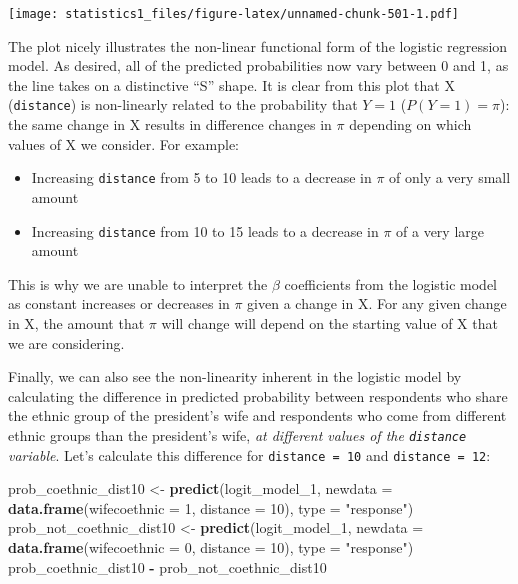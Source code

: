 \documentclass[]{article}
\newenvironment{Shaded}{\begin{snugshade}}{\end{snugshade}}
\newcommand{\KeywordTok}[1]{\textcolor[rgb]{0.13,0.29,0.53}{\textbf{#1}}}
\newcommand{\DataTypeTok}[1]{\textcolor[rgb]{0.13,0.29,0.53}{#1}}
\newcommand{\DecValTok}[1]{\textcolor[rgb]{0.00,0.00,0.81}{#1}}
\newcommand{\StringTok}[1]{\textcolor[rgb]{0.31,0.60,0.02}{#1}}
\newcommand{\OperatorTok}[1]{\textcolor[rgb]{0.81,0.36,0.00}{\textbf{#1}}}
\newcommand{\NormalTok}[1]{#1}
\providecommand{\tightlist}{%
  \setlength{\itemsep}{0pt}\setlength{\parskip}{0pt}}
\theoremstyle{definition}
\theoremstyle{definition}
\theoremstyle{definition}
\theoremstyle{remark}
\begin{document}
\texttt{[image: statistics1\_files/figure-latex/unnamed-chunk-501-1.pdf]}

The plot nicely illustrates the non-linear functional form of the
logistic regression model. As desired, all of the predicted
probabilities now vary between 0 and 1, as the line takes on a
distinctive ``S'' shape. It is clear from this plot that X
(\texttt{distance}) is non-linearly related to the probability that
\(Y=1\) (\(P(Y = 1) = \pi\)): the same change in X results in difference
changes in \(\pi\) depending on which values of X we consider. For
example:

\begin{itemize}
\tightlist
\item
  Increasing \texttt{distance} from 5 to 10 leads to a decrease in
  \(\pi\) of only a very small amount
\item
  Increasing \texttt{distance} from 10 to 15 leads to a decrease in
  \(\pi\) of a very large amount
\end{itemize}

This is why we are unable to interpret the \(\beta\) coefficients from
the logistic model as constant increases or decreases in \(\pi\) given a
change in X. For any given change in X, the amount that \(\pi\) will
change will depend on the starting value of X that we are considering.

Finally, we can also see the non-linearity inherent in the logistic
model by calculating the difference in predicted probability between
respondents who share the ethnic group of the president's wife and
respondents who come from different ethnic groups than the president's
wife, \emph{at different values of the \texttt{distance} variable}.
Let's calculate this difference for \texttt{distance\ =\ 10} and
\texttt{distance\ =\ 12}:

\begin{Shaded}
\begin{Highlighting}[]
\NormalTok{prob_coethnic_dist10 <-}\StringTok{ }\KeywordTok{predict}\NormalTok{(logit_model_}\DecValTok{1}\NormalTok{, }\DataTypeTok{newdata =} \KeywordTok{data.frame}\NormalTok{(}\DataTypeTok{wifecoethnic =} \DecValTok{1}\NormalTok{, }\DataTypeTok{distance =} \DecValTok{10}\NormalTok{), }\DataTypeTok{type =} \StringTok{"response"}\NormalTok{)}
\NormalTok{prob_not_coethnic_dist10 <-}\StringTok{ }\KeywordTok{predict}\NormalTok{(logit_model_}\DecValTok{1}\NormalTok{, }\DataTypeTok{newdata =} \KeywordTok{data.frame}\NormalTok{(}\DataTypeTok{wifecoethnic =} \DecValTok{0}\NormalTok{, }\DataTypeTok{distance =} \DecValTok{10}\NormalTok{), }\DataTypeTok{type =} \StringTok{"response"}\NormalTok{)}
\NormalTok{prob_coethnic_dist10 }\OperatorTok{-}\StringTok{ }\NormalTok{prob_not_coethnic_dist10}
\end{Highlighting}
\end{Shaded}
\end{document}
